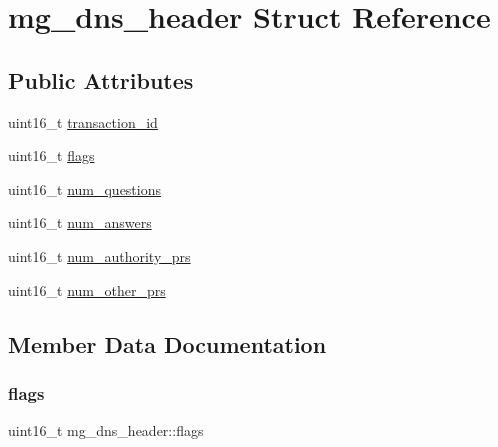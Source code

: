 \hypertarget{structmg__dns__header}{}\section{mg\+\_\+dns\+\_\+header Struct Reference}
\label{structmg__dns__header}
\subsection*{Public Attributes}
\begin{DoxyCompactItemize}
\item 
uint16\+\_\+t \hyperlink{structmg__dns__header_a00963ebb1d83de6f48f7733679c4b8a7_a00963ebb1d83de6f48f7733679c4b8a7}{transaction\+\_\+id}
\item 
uint16\+\_\+t \hyperlink{structmg__dns__header_a42a3a0530dcceaa67b96f054c1c44aa6_a42a3a0530dcceaa67b96f054c1c44aa6}{flags}
\item 
uint16\+\_\+t \hyperlink{structmg__dns__header_a156d3f5926d1fdb24bcbcba1f273c59a_a156d3f5926d1fdb24bcbcba1f273c59a}{num\+\_\+questions}
\item 
uint16\+\_\+t \hyperlink{structmg__dns__header_a2d577357775702ca340492ca51379b21_a2d577357775702ca340492ca51379b21}{num\+\_\+answers}
\item 
uint16\+\_\+t \hyperlink{structmg__dns__header_a90a7621286acf1c8b78d3ee450dce9b6_a90a7621286acf1c8b78d3ee450dce9b6}{num\+\_\+authority\+\_\+prs}
\item 
uint16\+\_\+t \hyperlink{structmg__dns__header_aed8714aa60f2cc79dc0c81378c2ddb50_aed8714aa60f2cc79dc0c81378c2ddb50}{num\+\_\+other\+\_\+prs}
\end{DoxyCompactItemize}


\subsection{Member Data Documentation}
\mbox{\label{structmg__dns__header_a42a3a0530dcceaa67b96f054c1c44aa6_a42a3a0530dcceaa67b96f054c1c44aa6}} 
\subsubsection{\texorpdfstring{flags}{flags}}
{\footnotesize\ttfamily uint16\+\_\+t mg\+\_\+dns\+\_\+header\+::flags}



